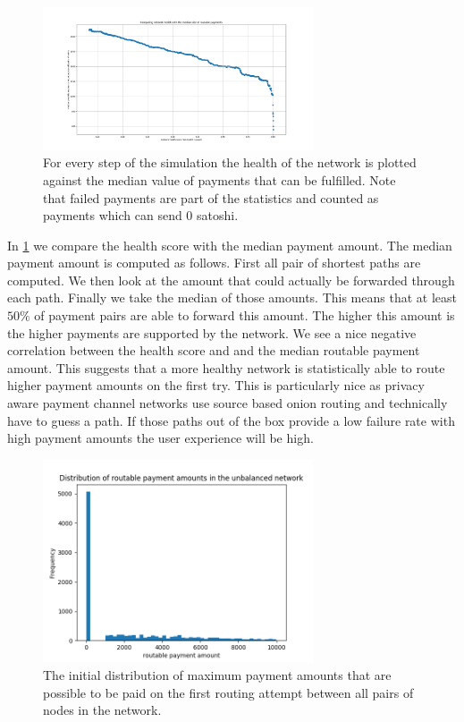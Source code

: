 \documentclass[a4paper]{paper}
\begin{document}
\begin{figure}
 \centering
 \includegraphics[width=8cm]{code/results/routabilityTest/health vs payment amt.png}
 \caption{For every step of the simulation the health of the network is plotted against the median value of payments that can be fulfilled. Note that failed payments are part of the statistics and counted as payments which can send $0$ satoshi.}
 \label{fig:healthVsPayment}
\end{figure}

In \cref{fig:healthVsPayment} we compare the health score with the median payment amount.
The median payment amount is computed as follows.
First all pair of shortest paths are computed.
We then look at the amount that could actually be forwarded through each path.
Finally we take the median of those amounts.
This means that at least $50\%$ of payment pairs are able to forward this amount.
The higher this amount is the higher payments are supported by the network.
We see a nice negative correlation between the health score and and the median routable payment amount.
This suggests that a more healthy network is statistically able to route higher payment amounts on the first try.
This is particularly nice as privacy aware payment channel networks use source based onion routing and technically have to guess a path. If those paths out of the box provide a low failure rate with high payment amounts the user experience will be high.

\begin{figure}
 \centering
 \includegraphics[width=8cm]{code/results/routabilityTest/paymentamtUnbalanced.png}
 \caption{The initial distribution of maximum payment amounts that are possible to be paid on the first routing attempt between all pairs of nodes in the network.}
 \label{fig:paymentUnbalanced}
\end{figure}
\end{document}
